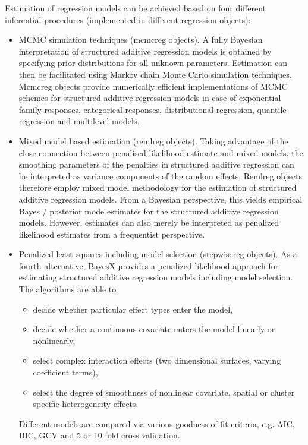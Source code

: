 Estimation of regression models can be achieved based on four different inferential procedures (implemented in different regression objects):
\begin{itemize}
 \item MCMC simulation techniques (mcmcreg objects). A fully Bayesian interpretation of structured additive regression models is obtained by specifying prior distributions for all unknown parameters. Estimation can then be facilitated using Markov chain Monte Carlo simulation techniques. Mcmcreg objects provide numerically efficient implementations of MCMC schemes for structured additive regression models in case of exponential family responses, categorical responses, distributional regression, quantile regression and multilevel models.
 \item  Mixed model based estimation (remlreg objects). Taking advantage of the close connection between penalised likelihood estimate and mixed models, the smoothing parameters of the penalties in structured additive regression can be interpreted as variance components of the random effects. Remlreg objects therefore employ mixed model methodology for the estimation of structured additive regression models. From a Bayesian perspective, this yields empirical Bayes / posterior mode estimates for the structured additive regression models. However, estimates can also merely be interpreted as penalized likelihood estimates from a frequentist perspective.
 \item Penalized least squares including model selection (stepwisereg objects). As a fourth alternative, BayesX provides a penalized likelihood approach for estimating structured additive regression models including model selection. The algorithms are able to
 \begin{itemize}
  \item decide whether particular effect types enter the model,
  \item decide whether a continuous covariate enters the model linearly or nonlinearly,
  \item select complex interaction effects (two dimensional surfaces, varying coefficient terms),
  \item select the degree of smoothness of nonlinear covariate, spatial or cluster specific heterogeneity effects.
 \end{itemize}
     Different models are compared via various goodness of fit criteria, e.g. AIC, BIC, GCV and 5 or 10 fold cross validation.
\end{itemize}

